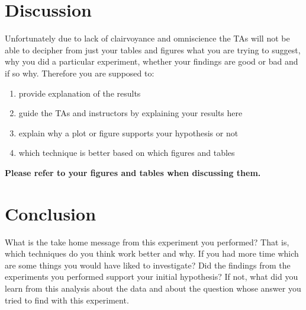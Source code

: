\section{Discussion}
Unfortunately due to lack of clairvoyance and omniscience the TAs will not be able to decipher from just your tables and figures what you are trying to suggest, why you did a particular experiment, whether your 
findings are good or bad and if so why. Therefore you are supposed to: 
\begin{enumerate}
 \item provide explanation of the results
 \item guide the TAs and instructors by explaining your results here
 \item explain why a plot or figure supports your hypothesis or not
 \item which technique is better based on which figures and tables
\end{enumerate}
\textbf{Please refer to your figures and tables when discussing them.}
\section{Conclusion}
What is the take home message from this experiment you performed? That is, which techniques do you think work better and why. If you had more time which are some things you would have liked to investigate? Did the 
findings from the experiments you performed support your initial hypothesis? If not, what did you learn from this analysis about the data and about the question whose answer you tried to find with this experiment. 